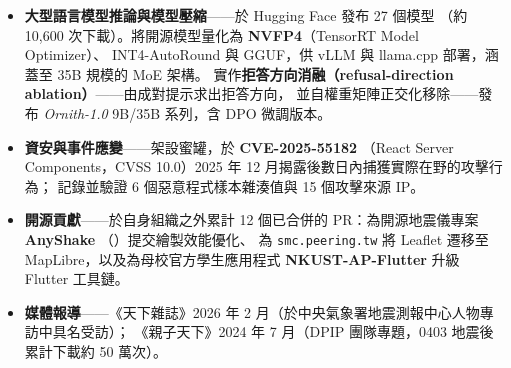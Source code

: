 \documentclass[zh]{resume}
\begin{document}
\begin{itemize}
  \item \textbf{大型語言模型推論與模型壓縮}——於 Hugging Face 發布 27 個模型
    （約 10,600 次下載）。將開源模型量化為 \textbf{NVFP4}（TensorRT Model Optimizer）、
    INT4-AutoRound 與 GGUF，供 vLLM 與 llama.cpp 部署，涵蓋至 35B 規模的 MoE 架構。
    實作\textbf{拒答方向消融（refusal-direction ablation）}——由成對提示求出拒答方向，
    並自權重矩陣正交化移除——發布 \emph{Ornith-1.0} 9B/35B 系列，含 DPO 微調版本。
  \item \textbf{資安與事件應變}——架設蜜罐，於 \textbf{CVE-2025-55182}
    （React Server Components，CVSS 10.0）2025 年 12 月揭露後數日內捕獲實際在野的攻擊行為；
    記錄並驗證 6 個惡意程式樣本雜湊值與 15 個攻擊來源 IP。
  \item \textbf{開源貢獻}——於自身組織之外累計 12 個已合併的 PR：為開源地震儀專案 \textbf{AnyShake}
    （）提交繪製效能優化、
    為 \texttt{smc.peering.tw} 將 Leaflet 遷移至 MapLibre，以及為母校官方學生應用程式
    \textbf{NKUST-AP-Flutter} 升級 Flutter 工具鏈。
  \item \textbf{媒體報導}——《天下雜誌》2026 年 2 月（於中央氣象署地震測報中心人物專訪中具名受訪）；
    《親子天下》2024 年 7 月（DPIP 團隊專題，0403 地震後累計下載約 50 萬次）。
\end{itemize}
\end{document}
